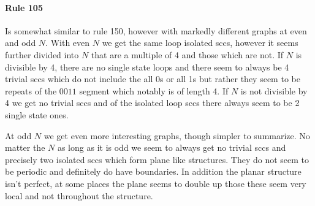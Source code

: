 \documentclass[11pt]{article}
\begin{document}
\paragraph{Rule 105}
Is somewhat similar to rule 150, however with markedly different graphs at even and odd $N$.
With even $N$ we get the same loop isolated sccs, however it seems further divided into $N$ that are a multiple of 4 and those which are not.
If $N$ is divisible by 4, there are no single state loops and there seem to always be 4 trivial sccs which do not include the all 0s or all 1s but rather they seem to be repeats of the $0011$ segment which notably is of length 4.
If $N$ is not divisible by 4 we get no trivial sccs and of the isolated loop sccs there always seem to be 2 single state ones.

At odd $N$ we get even more interesting graphs, though simpler to summarize.
No matter the $N$ as long as it is odd we seem to always get no trivial sccs and precisely two isolated sccs which form plane like structures.
They do not seem to be periodic and definitely do have boundaries.
In addition the planar structure isn't perfect, at some places the plane seems to double up those these seem very local and not throughout the structure.
\end{document}
